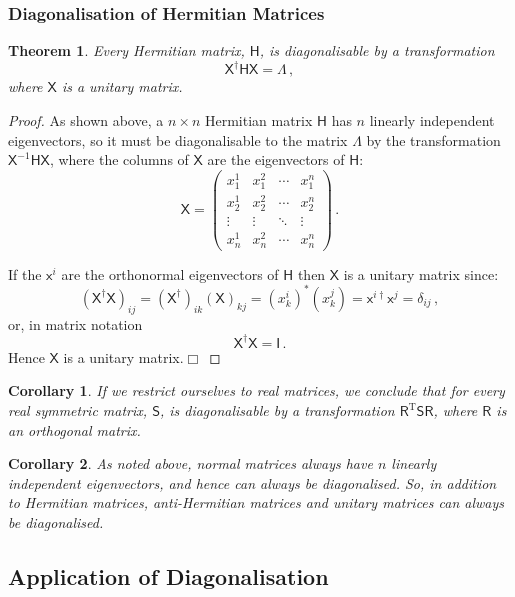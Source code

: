 \documentclass{article}
\theoremstyle{plain}\theoremheaderfont{\normalfont\itshape}\theorembodyfont{\rmfamily}\theoremseparator{.}\newtheorem*{rem}{Remark}\newtheorem*{ex}{Example}\newtheorem*{proof}{Proof}\newtheorem*{altp}{Alternative proof}
\theoremstyle{plain}\theoremheaderfont{\normalfont\bfseries}\theorembodyfont{\rmfamily}\theoremseparator{.}\newtheorem{thm}{Theorem}[section]\newtheorem{lem}[thm]{Lemma}\newtheorem{prop}[thm]{Proposition}\newtheorem*{cor}{Corollary}\newtheorem{defn}[thm]{Definition}\newtheorem{clm}[thm]{Claim}\newtheorem{clminproof}{Claim}
\theoremstyle{break}\theoremheaderfont{\normalfont\itshape}\theorembodyfont{\rmfamily}\theoremseparator{.\medskip}\newtheorem*{proofskip}{Proof}\newtheorem*{exs}{Examples}\newtheorem*{rems}{Remarks}
\theoremstyle{break}\theoremheaderfont{\normalfont\bfseries}\theorembodyfont{\rmfamily}\theoremseparator{.\medskip}\newtheorem{lemskip}[thm]{Lemma}\newtheorem{defnskip}[thm]{Definition}\newtheorem{propskip}[thm]{Proposition}\newtheorem{thmskip}[thm]{Theorem}
\numberwithin{equation}{section}
\newcommand{\qed}{\hfill\ensuremath{\Box}}
\newcommand{\tp}{^\mathrm{T}}
\begin{document}
	\subsubsection{Diagonalisation of Hermitian Matrices}	
	\begin{thm}
		Every Hermitian matrix, \(\mathsf{H}\), is diagonalisable by a transformation
		\[\mathsf{X^\dagger HX=\Lambda}\,,\]
		where \(\mathsf{X}\) is a unitary matrix.
	\end{thm}
	\begin{proof}
		As shown above, a \(n\times n\) Hermitian matrix \(\mathsf{H}\) has \(n\) linearly independent eigenvectors, so it must be diagonalisable to the matrix \(\mathsf{\Lambda}\) by the transformation \(\mathsf{X}^{-1}\mathsf{HX}\), where the columns of \(\mathsf{X}\) are the eigenvectors of \(\mathsf{H}\):
		\[\mathsf{X}=\begin{pmatrix}
			x_1^1 & x_1^2 & \cdots & x_1^n\\
			x_2^1 & x_2^2 & \cdots & x_2^n\\
			\vdots & \vdots & \ddots & \vdots\\
			x_n^1 & x_n^2 & \cdots & x_n^n
		\end{pmatrix}\,.\]
		
		If the \(\mathsf{x}^i\) are the orthonormal eigenvectors of \(\mathsf{H}\) then \(\mathsf{X}\) is a unitary matrix since:
		\[(\mathsf{X^\dagger X})_{ij}=(\mathsf{X}^\dagger)_{ik}(\mathsf{X})_{kj}=(x^i_k)^*(x^j_k)=\mathsf{x}^{i\dagger}\mathsf{x}^j=\delta_{ij}\,,\]
		or, in matrix notation
		\[\mathsf{X^\dagger X=I}\,.\]
		Hence \(\mathsf{X}\) is a unitary matrix.\qed
	\end{proof}
		
	\begin{cor}
		If we restrict ourselves to real matrices, we conclude that for every real symmetric matrix, \(\mathsf{S}\), is diagonalisable by a transformation \(\mathsf{R}\tp\mathsf{SR}\), where \(\mathsf{R}\) is an orthogonal matrix.
	\end{cor}
	
	\begin{cor}
		As noted above, normal matrices always have \(n\) linearly independent eigenvectors, and hence can always be diagonalised. So, in addition to Hermitian matrices, anti-Hermitian matrices and unitary matrices can always be diagonalised. 		
	\end{cor}
	
	\subsection{Application of Diagonalisation}
\end{document}

